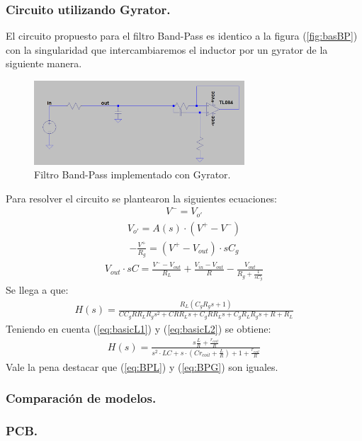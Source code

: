 \documentclass[a4paper]{article}
\begin{document}
\subsubsection{Circuito utilizando Gyrator.}
El circuito propuesto para el filtro Band-Pass es identico a la figura (\ref{fig:basBP}) con la singularidad que intercambiaremos el inductor por un gyrator de la siguiente manera.
\begin{figure}[H]	
	\centering
	\includegraphics[width=0.7\textwidth]{gyrBP.PNG}
	\caption{Filtro Band-Pass implementado con Gyrator.}
	\label{fig:gyrBP}
\end{figure}
Para resolver el circuito se plantearon la siguientes ecuaciones:
\begin{align}V^- = V_{o'}\end{align}
\begin{align}V_{o'} = A(s)\cdot (V^+-V^-)\end{align}
\begin{align} -\frac{V^+}{R_g}=(V^+-V_{out})\cdot sC_g \end{align}
\begin{align}  V_{out}\cdot sC= \frac{V^--V_{out}}{R_L}+\frac{V_{in}-V_{out}}{R}-\frac{V_{out}}{R_g+\frac{1}{sC_g}}\end{align}
Se llega a que:
\begin{align}H(s)=\frac{R_{L} \left(C_{g} R_{g} s + 1\right)}{C C_{g} R R_{L} R_{g} s^{2} + C R R_{L} s + C_{g} R R_{L} s + C_{g} R_{L} R_{g} s + R + R_{L}}
\end{align}
Teniendo en cuenta (\ref{eq:basicL1}) y (\ref{eq:basicL2}) se obtiene:
\begin{align}H(s)=\frac{s\frac{L}{R}+\frac{r_{coil}}{R}}{s^2\cdot LC +s \cdot (Cr_{coil}+\frac{L}{R})+1+\frac{r_{coil}}{R}}
\label{eq:BPG}
\end{align}
Vale la pena destacar que (\ref{eq:BPL}) y (\ref{eq:BPG}) son iguales.
\subsubsection{Comparación de modelos.}
\subsubsection{PCB.}
\end{document}
